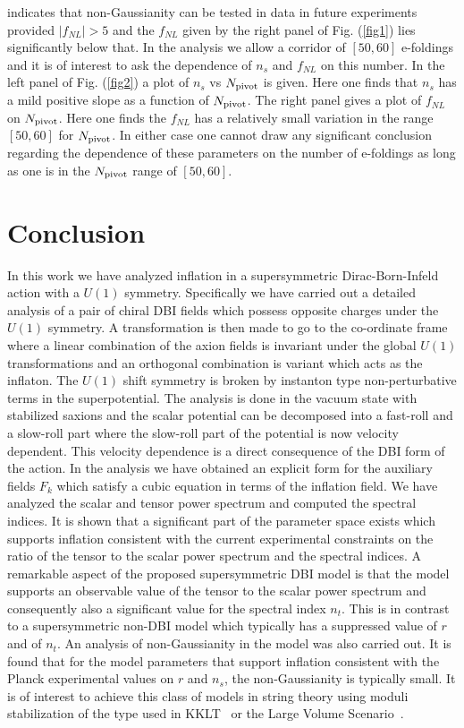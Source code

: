 \documentclass[a4paper,11pt]{article}
\begin{document}
  indicates that non-Gaussianity can be tested in data in future experiments provided $|f_{NL}|> 5$ and the $f_{NL}$
  given by the right panel of Fig. (\ref{fig1}) lies significantly below that. In the analysis we allow a corridor of $[50,60]$
  e-foldings and it is of interest to ask the dependence of $n_s$ and $f_{NL}$ on this number. In the left panel of Fig. (\ref{fig2})
  a plot of $n_s$ vs $N_{\rm pivot}$ is given. Here one finds that $n_s$ has a mild positive slope as a function of $N_{\rm pivot}$.
  The right panel gives a plot of $f_{NL}$ on $N_{\rm pivot}$. Here one finds the $f_{NL}$ has a relatively small variation in the range $[50,60]$ for
  $N_{\rm pivot}$. In either case one cannot draw any significant conclusion regarding the dependence of these parameters
  on the number of e-foldings as long as one is in the $N_{\rm pivot}$ range of $[50,60]$.

\section{Conclusion\label{sec7}}
	In this work we have analyzed inflation in a supersymmetric Dirac-Born-Infeld action with a $U(1)$ symmetry.
	Specifically we have carried out a detailed analysis of a pair of chiral DBI fields which possess opposite charges
	under the $U(1)$ symmetry. A transformation is then made to go to the co-ordinate frame where a linear
	combination of the axion fields is invariant under the global $U(1)$ transformations and an orthogonal combination
	is variant which acts as the inflaton. The $U(1)$ shift symmetry is broken by instanton type non-perturbative terms
	in the superpotential. The analysis is done
	in the vacuum state with stabilized saxions and the scalar potential can be decomposed into a fast-roll and a slow-roll
	part where the slow-roll part of the potential is now velocity dependent. This velocity dependence is a direct consequence of the
	DBI form of the action. In the analysis we have obtained an explicit form for the auxiliary fields $F_k$ which satisfy a cubic equation
	in terms of the inflation field. We have analyzed the scalar and tensor power spectrum and computed the spectral indices.
	It is shown that a significant part of the parameter space exists which supports inflation consistent with the current experimental
	constraints on the ratio of the tensor to the scalar power spectrum and the spectral indices. A remarkable aspect of the
	proposed supersymmetric DBI model is that the model supports an observable value of the tensor to the scalar power spectrum
	and consequently also a significant value for the spectral index $n_t$. This is in contrast to a supersymmetric non-DBI model
	which typically has a suppressed value of $r$ and of $n_t$. An analysis of non-Gaussianity in the model was also carried out.
	It is found that for the model parameters that support inflation consistent with the Planck experimental values on $r$ and
	$n_s$, the non-Gaussianity is typically small. It is of interest to achieve this class of models in string theory using
	moduli stabilization of the type used in KKLT~\cite{Kachru:2003aw}
	or the Large Volume Scenario~\cite{Balasubramanian:2005zx}.
\end{document}
